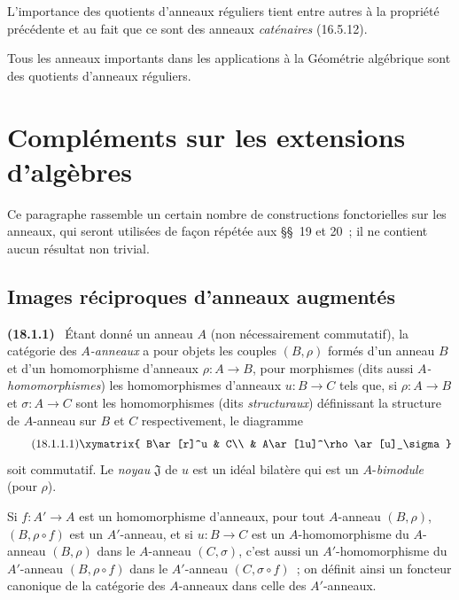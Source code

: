 \documentclass[10pt,oneside]{book}
\makeatletter
\newcommand{\setmanualcurrentlabel}[1]{\def\@currentlabel{#1}}
\newcommand{\oldpage}[2][]{%
  \setcounter{footnote}{0}%
  \marginpar{\scriptsize\textbf{#1}~|~#2}\ignorespaces}
\newenvironment{env}[1][]{\setmanualcurrentlabel{#1}\par\medskip\noindent\textbf{(#1)}\ }{\par}
\makeatother
\begin{document}
L'importance des quotients d'anneaux réguliers tient entre autres à la
propriété précédente et au fait que ce sont des anneaux \emph{caténaires}
(16.5.12).

Tous les anneaux importants dans les applications à la Géométrie algébrique
sont des quotients d'anneaux réguliers.


%
\section{Compléments sur les extensions d'algèbres}
\label{section:0.18-fr}

Ce paragraphe rassemble un certain nombre de constructions fonctorielles sur
les anneaux, qui seront utilisées de façon répétée aux \S\S~19 et 20~; il ne
contient aucun résultat non trivial.

\subsection{Images réciproques d'anneaux augmentés}
\label{subsection:0.18.1-fr}

\begin{env}[18.1.1]
\label{0.18.1.1-fr}
Étant donné un anneau $A$ (non nécessairement commutatif), la catégorie des
\emph{$A$-anneaux} a pour objets les couples $(B,\rho)$ formés d'un anneau
$B$ et d'un homomorphisme d'anneaux $\rho:A\to B$, pour morphismes (dits aussi
\emph{$A$-homomorphismes}) les homomorphismes d'anneaux $u:B\to C$ tels que,
si $\rho:A\to B$ et $\sigma:A\to C$ sont les homomorphismes (dits
\emph{structuraux}) définissant la structure de $A$-anneau sur $B$ et $C$
respectivement, le diagramme
\begin{equation}
\label{0.18.1.1.1-fr}
\tag{18.1.1.1}
  \xymatrix{
    B\ar[r]^u & C\\
    & A\ar[lu]^\rho\ar[u]_\sigma
  }
\end{equation}
soit commutatif. Le \emph{noyau} $\mathfrak{J}$ de $u$ est un idéal bilatère
qui est un $A$-\emph{bimodule} (pour $\rho$).

Si $f:A'\to A$ est un homomorphisme d'anneaux, pour tout $A$-anneau
$(B,\rho)$, $(B,\rho\circ f)$ est un $A'$-anneau, et si $u:B\to C$ est un
$A$-homomorphisme du $A$-anneau $(B,\rho)$
\oldpage[0\textsubscript{IV-1}]{52}
dans le $A$-anneau $(C,\sigma)$, c'est aussi un $A'$-homomorphisme du
$A'$-anneau $(B,\rho\circ f)$ dans le $A'$-anneau $(C,\sigma\circ f)$~; on
définit ainsi un foncteur canonique de la catégorie des $A$-anneaux dans celle
des $A'$-anneaux.
\end{env}
\end{document}
